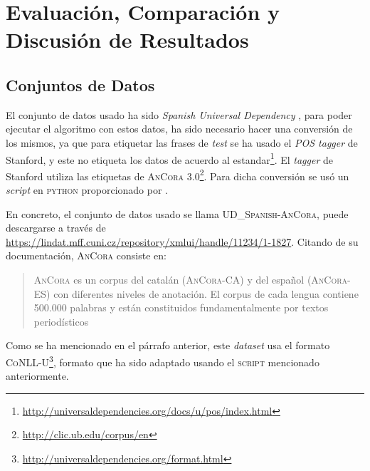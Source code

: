 \chapter{Evaluación, Comparación y Discusión de Resultados}
\label{ch:eval}

\section{Conjuntos de Datos}
\label{sec:datasets}

El conjunto de datos usado ha sido \emph{Spanish Universal Dependency}
\cite{udv14}, para poder ejecutar el algoritmo con estos datos, ha sido
necesario hacer una conversión de los mismos, ya que para etiquetar las frases
de \emph{test} se ha usado el \emph{\ac{POS} tagger} de Stanford, y este no
etiqueta los datos de acuerdo al
estandar\footnote{\url{http://universaldependencies.org/docs/u/pos/index.html}}. El
\emph{tagger} de Stanford utiliza las etiquetas de \textsc{AnCora
  3.0}\footnote{\url{http://clic.ub.edu/corpus/en}}. Para dicha conversión se
usó un \emph{script} en \textsc{python} proporcionado por \citeauthor{rohit2016}
\cite{rohit2016}.

En concreto, el conjunto de datos usado se llama \textsc{UD\_Spanish-AnCora},
puede descargarse a través de
\url{https://lindat.mff.cuni.cz/repository/xmlui/handle/11234/1-1827}. Citando
de su documentación, \textsc{AnCora} consiste en:
\begin{quotation}
  \textsc{AnCora} es un corpus del catalán \textsc{(AnCora-CA)} y del español
  \textsc{(AnCora-ES)} con diferentes niveles de anotación. El corpus de cada
  lengua contiene 500.000 palabras y están constituidos fundamentalmente por
  textos periodísticos
\end{quotation}
Como se ha mencionado en el párrafo anterior, este \emph{dataset} usa el formato
\textsc{CoNLL-U}\footnote{\url{http://universaldependencies.org/format.html}},
formato que ha sido adaptado usando el \textsc{script} mencionado anteriormente.

